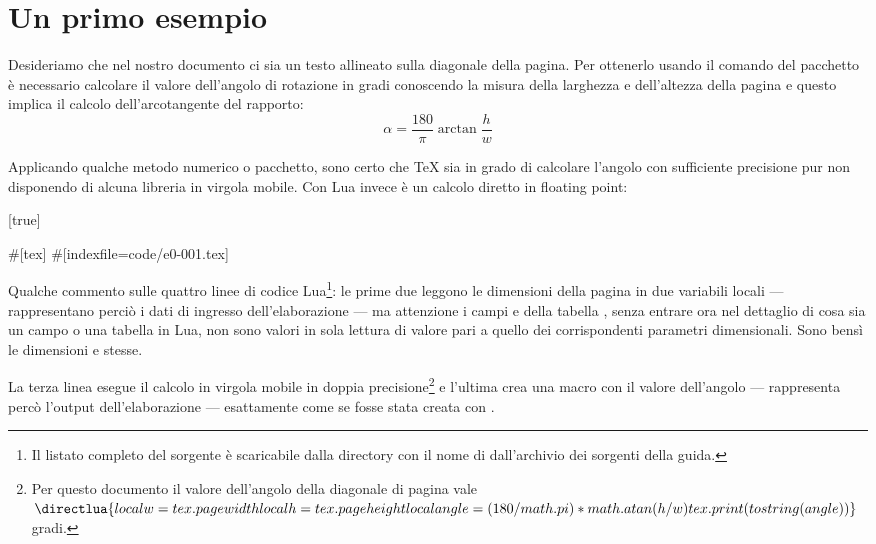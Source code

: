 \section{Un primo esempio}

Desideriamo che nel nostro documento ci sia un testo allineato sulla diagonale
della pagina. Per ottenerlo usando il comando  del pacchetto
 è necessario calcolare il valore dell'angolo di rotazione in
gradi conoscendo la misura della larghezza e dell'altezza della pagina e questo
implica il calcolo dell'arcotangente del rapporto:
\[
    \alpha = \frac{180}{\pi}\arctan{\frac{h}{w}}
\]

Applicando qualche metodo numerico o pacchetto, sono certo che \TeX{} sia in
grado di calcolare l'angolo con sufficiente precisione pur non disponendo di
alcuna libreria in virgola mobile. Con Lua invece è un calcolo diretto in
floating point:

[true]%
%
%
\begin{lines}
#[tex]
#[indexfile=code/e0-001.tex]
\end{lines}

Qualche commento sulle quattro linee di codice Lua\footnote{Il listato completo
del sorgente è scaricabile dalla directory  con il nome di
 dall'archivio dei sorgenti della guida.}: le prime due
leggono le dimensioni della pagina in due variabili locali --- rappresentano
perciò i dati di ingresso dell'elaborazione --- ma attenzione i campi
 e  della tabella , senza entrare ora
nel dettaglio di cosa sia un campo o una tabella in Lua, non sono valori in sola
lettura di valore pari a quello dei corrispondenti parametri dimensionali. Sono
bensì le dimensioni  e  stesse.

La terza linea esegue il calcolo in virgola mobile in doppia
precisione\footnote{Per questo documento il valore dell'angolo della diagonale
di pagina vale \( \directlua{
    local w = tex.pagewidth
    local h = tex.pageheight
    local angle = (180/math.pi) * math.atan(h/w)
    tex.print(tostring(angle))
}\) gradi.} e l'ultima crea una macro  con il valore dell'angolo ---
rappresenta percò l'output dell'elaborazione --- esattamente come se fosse stata
creata con .

